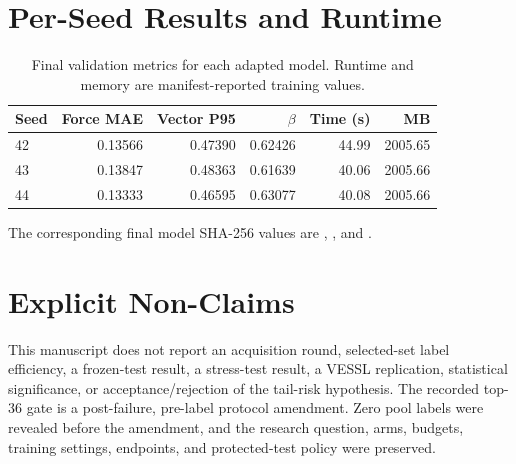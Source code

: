 \section{Per-Seed Results and Runtime}

\begin{table}[h]
\caption{Final validation metrics for each adapted model. Runtime and memory are manifest-reported training values.}
\label{tab:seeds}
\centering
\footnotesize
\setlength{\tabcolsep}{3pt}
\begin{tabular}{@{}lrrrrr@{}}
\toprule
Seed & Force MAE & Vector P95 & $\beta$ & Time (s) & MB \\
\midrule
42 & 0.13566 & 0.47390 & 0.62426 & 44.99 & 2005.65 \\
43 & 0.13847 & 0.48363 & 0.61639 & 40.06 & 2005.66 \\
44 & 0.13333 & 0.46595 & 0.63077 & 40.08 & 2005.66 \\
\bottomrule
\end{tabular}
\end{table}

The corresponding final model SHA-256 values are , , and .

\section{Explicit Non-Claims}

This manuscript does not report an acquisition round, selected-set label efficiency, a frozen-test result, a stress-test result, a VESSL replication, statistical significance, or acceptance/rejection of the tail-risk hypothesis. The recorded top-36 gate is a post-failure, pre-label protocol amendment. Zero pool labels were revealed before the amendment, and the research question, arms, budgets, training settings, endpoints, and protected-test policy were preserved.
